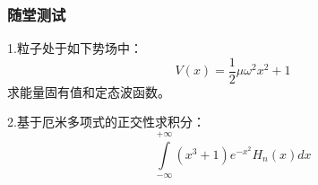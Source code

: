 \begin{frame}
	\frametitle{随堂测试}
	\begin{exampleblock} {1.粒子处于如下势场中：}
		\begin{equation*}
			V(x)= \frac{1}{2} \mu \omega ^2 x^2  +1
		\end{equation*}
		\hspace{2em}求能量固有值和定态波函数。
	\end{exampleblock}	
	\begin{exampleblock} {2.基于厄米多项式的正交性求积分：}
		\begin{equation*}
			\int\limits_{-\infty}^{+\infty} (x^3 +1)e^{-x^{2}} H_n(x) d x 
		\end{equation*}
	\end{exampleblock}	
\end{frame}